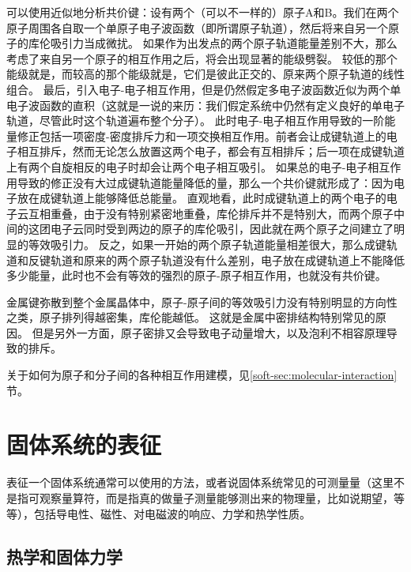 可以使用近似地分析共价键：设有两个（可以不一样的）原子A和B。我们在两个原子周围各自取一个单原子电子波函数（即所谓原子轨道），然后将来自另一个原子的库伦吸引力当成微扰。
如果作为出发点的两个原子轨道能量差别不大，那么考虑了来自另一个原子的相互作用之后，将会出现显著的能级劈裂。
较低的那个能级就是，而较高的那个能级就是，它们是彼此正交的、原来两个原子轨道的线性组合。
最后，引入电子-电子相互作用，但是仍然假定多电子波函数近似为两个单电子波函数的直积（这就是一说的来历：我们假定系统中仍然有定义良好的单电子轨道，尽管此时这个轨道遍布整个分子）。
此时电子-电子相互作用导致的一阶能量修正包括一项密度-密度排斥力和一项交换相互作用。前者会让成键轨道上的电子相互排斥，然而无论怎么放置这两个电子，都会有互相排斥；后一项在成键轨道上有两个自旋相反的电子时却会让两个电子相互吸引。
如果总的电子-电子相互作用导致的修正没有大过成键轨道能量降低的量，那么一个共价键就形成了：因为电子放在成键轨道上能够降低总能量。
直观地看，此时成键轨道上的两个电子的电子云互相重叠，由于没有特别紧密地重叠，库伦排斥并不是特别大，而两个原子中间的这团电子云同时受到两边的原子的库伦吸引，因此就在两个原子之间建立了明显的等效吸引力。
反之，如果一开始的两个原子轨道能量相差很大，那么成键轨道和反键轨道和原来的两个原子轨道没有什么差别，电子放在成键轨道上不能降低多少能量，此时也不会有等效的强烈的原子-原子相互作用，也就没有共价键。

金属键弥散到整个金属晶体中，原子-原子间的等效吸引力没有特别明显的方向性之类，原子排列得越密集，库伦能越低。
这就是金属中密排结构特别常见的原因。
但是另外一方面，原子密排又会导致电子动量增大，以及泡利不相容原理导致的排斥。

关于如何为原子和分子间的各种相互作用建模，见\ref{soft-sec:molecular-interaction}节。

\section{固体系统的表征}

表征一个固体系统通常可以使用的方法，或者说固体系统常见的可测量量（这里不是指可观察量算符，而是指真的做量子测量能够测出来的物理量，比如说期望，等等），包括导电性、磁性、对电磁波的响应、力学和热学性质。

\subsection{热学和固体力学}

